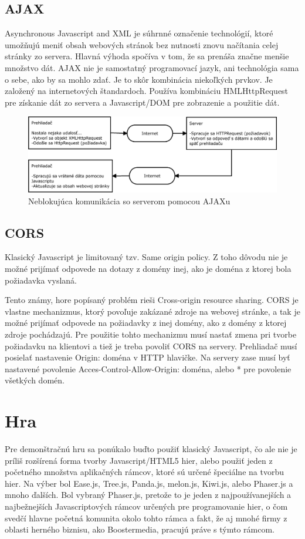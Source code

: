 \subsection{AJAX}
\label{sec:ajax}
Asynchronous Javascript and XML je súhrnné označenie technológií, ktoré umožňujú meniť obsah webových stránok bez nutnosti znovu načítania celej stránky zo servera. Hlavná výhoda spočíva v tom, že sa prenáša značne menšie množstvo dát. AJAX nie je samostatný programovací jazyk, ani technológia sama o sebe, ako by sa mohlo zdať. Je to skôr kombinácia niekoľkých prvkov. Je založený na internetových štandardoch. Používa kombináciu HMLHttpRequest pre získanie dát zo servera a Javascript/DOM pre zobrazenie a použitie dát. \cite{w3-ajax}
\begin{figure}[h]
  \centering
  \includegraphics[scale=0.40]{fig/ajax.eps}
  \caption{Neblokujúca komunikácia so serverom pomocou AJAXu}
  \label{fig:ajax}
\end{figure}

\subsection{CORS}
\label{sec:cors}
Klasický Javascript je limitovaný tzv. Same origin policy. Z toho dôvodu nie je možné prijímať odpovede na dotazy z domény inej, ako je doména z ktorej bola požiadavka vyslaná.

Tento známy, hore popísaný problém rieši Cross-origin resource sharing. CORS je vlastne mechanizmus, ktorý povoľuje zakázané zdroje na webovej stránke, a tak je možné prijímať odpovede na požiadavky z inej domény, ako z domény z ktorej zdroje pochádzajú. Pre použitie tohto mechanizmu musí nastať zmena pri tvorbe požiadavku na klientovi a tiež je treba povoliť CORS na servery. Prehliadač musí posielať nastavenie Origin: doména v HTTP hlavičke. Na servery zase musí byť nastavené povolenie Acces-Control-Allow-Origin: doména, alebo * pre povolenie všetkých domén. \cite{cors}

\section{Hra}
\label{sec:hra}
Pre demonštračnú hru sa ponúkalo buďto použiť klasický Javascript, čo ale nie je príliš rozšírená forma tvorby Javascript/HTML5 hier, alebo použiť jeden z početného množstva aplikačných rámcov, ktoré sú určené špeciálne na tvorbu hier. Na výber bol Ease.js, Tree.js, Panda.js, melon.js, Kiwi.js, alebo Phaser.js a mnoho ďalších. Bol vybraný Phaser.js, pretože to je jeden z najpoužívanejších a najbežnejších Javascriptových rámcov určených pre programovanie hier, o čom svedčí hlavne početná komunita okolo tohto rámca a fakt, že aj mnohé firmy z oblasti herného biznisu, ako Boostermedia, pracujú práve s týmto rámcom. 

